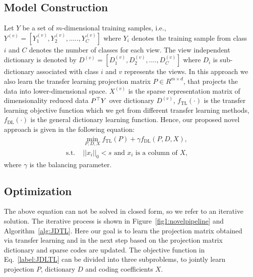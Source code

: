 \subsection{Model Construction}
Let $Y$ be a set of $m$-dimensional training samples, i.e., $Y^{(v)} = [Y_1^{(v)}, Y_2^{(v)}, ....., Y_C^{(v)}]$ where $Y_i$ denotes the training sample from class $i$ and $C$ denotes the number of classes for each view. The view independent dictionary is denoted by $D^{(v)}= [D_1^{(v)}, D_2^{(v)},....,D_C^{(v)}]$ where $D_i$ is sub-dictionary associated with class $i$ and $v$ represents the views. In this approach we also learn the transfer learning projection matrix $P \in R^{m\times d}$, that projects the data into lower-dimensional space. $X^{(v)}$ is the sparse representation matrix of dimensionality reduced data $P^\top Y$ over dictionary $D^{(v)}$,
$f_{\text{TL}}(\cdot)$ is the transfer learning objective function which we get from different transfer learning methods, $f_{\text{DL}}(\cdot)$ is the general dictionary learning function. Hence, our proposed novel approach is given in the following equation:
\begin{equation}
\begin{aligned}
& \min_{P,D,X} f_{\text{TL}}(P) + \gamma f_{\text{DL}}(P,D,X), \\
\text{s.t. } & ||x_i||_0 < s \text{ and } x_i \text { is a column of } X,
\end{aligned}
\label{label:JDLTL}
\end{equation}
where $\gamma$ is the balancing parameter.


\subsection{Optimization}
The above equation can not be solved in closed form, so we refer to an iterative solution. The iterative process is shown in Figure~\ref{fig1:novelpipeline} and Algorithm~\ref{alg:JDTL}. Here our goal is to learn the projection matrix obtained via transfer learning and in the next step based on the projection matrix dictionary and sparse codes are updated.
The objective function in Eq.~\eqref{label:JDLTL} can be divided into three subproblems, to jointly learn projection $P$, dictionary $D$ and coding coefficients $X$.

